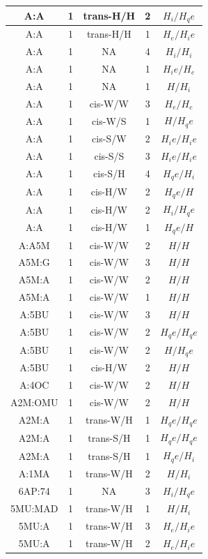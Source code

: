 \begin{center}
\begin{longtable}{c|c|c|c|c}
A:A & 1 & trans-H/H & 2 & $H_i/H_qe$ \\  \hline
A:A & 1 & trans-H/H & 1 & $H_e/H_ie$ \\  \hline
A:A & 1 & NA & 4 & $H_i/H_i$ \\  \hline
A:A & 1 & NA & 1 & $H_ie/H_e$ \\  \hline
A:A & 1 & NA & 1 & $H/H_i$ \\  \hline
A:A & 1 & cis-W/W & 3 & $H_e/H_e$ \\  \hline
A:A & 1 & cis-W/S & 1 & $H/H_qe$ \\  \hline
A:A & 1 & cis-S/W & 2 & $H_ie/H_ie$ \\  \hline
A:A & 1 & cis-S/S & 3 & $H_ie/H_ie$ \\  \hline
A:A & 1 & cis-S/H & 4 & $H_qe/H_i$ \\  \hline
A:A & 1 & cis-H/W & 2 & $H_qe/H$ \\  \hline
A:A & 1 & cis-H/W & 2 & $H_i/H_qe$ \\  \hline
A:A & 1 & cis-H/W & 1 & $H_qe/H$ \\  \hline
A:A5M & 1 & cis-W/W & 2 & $H/H$ \\  \hline
A5M:G & 1 & cis-W/W & 3 & $H/H$ \\  \hline
A5M:A & 1 & cis-W/W & 2 & $H/H$ \\  \hline
A5M:A & 1 & cis-W/W & 1 & $H/H$ \\  \hline
A:5BU & 1 & cis-W/W & 3 & $H/H$ \\  \hline
A:5BU & 1 & cis-W/W & 2 & $H_qe/H_qe$ \\  \hline
A:5BU & 1 & cis-W/W & 2 & $H/H_qe$ \\  \hline
A:5BU & 1 & cis-H/W & 2 & $H/H$ \\  \hline
A:4OC & 1 & cis-W/W & 2 & $H/H$ \\  \hline
A2M:OMU & 1 & cis-W/W & 2 & $H/H$ \\  \hline
A2M:A & 1 & trans-W/H & 1 & $H_qe/H_qe$ \\  \hline
A2M:A & 1 & trans-S/H & 1 & $H_qe/H_qe$ \\  \hline
A2M:A & 1 & trans-S/H & 1 & $H_qe/H_i$ \\  \hline
A:1MA & 1 & trans-W/H & 2 & $H/H_i$ \\  \hline
6AP:74 & 1 & NA & 3 & $H_i/H_qe$ \\  \hline
5MU:MAD & 1 & trans-W/H & 1 & $H/H_i$ \\  \hline
5MU:A & 1 & trans-W/H & 3 & $H_e/H_ie$ \\  \hline
5MU:A & 1 & trans-W/H & 2 & $H_e/H_ie$ \\  \hline

\end{longtable}
\end{center}
